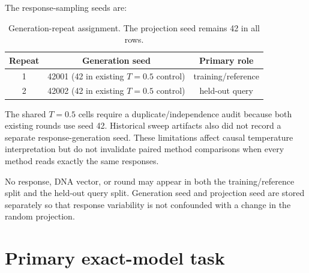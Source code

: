 \documentclass[11pt,a4paper]{article}
\begin{document}
The response-sampling seeds are:

\begin{table}[ht]
\centering
\caption{Generation-repeat assignment. The projection seed remains 42 in all rows.}
\label{tab:repeat-assignment}
\begin{tabular}{ccc}
\toprule
Repeat & Generation seed & Primary role \\
\midrule
1 & 42001 (42 in existing $T=0.5$ control) & training/reference \\
2 & 42002 (42 in existing $T=0.5$ control) & held-out query \\
\bottomrule
\end{tabular}
\end{table}

The shared $T=0.5$ cells require a duplicate/independence audit because both
existing rounds use seed 42. Historical sweep artifacts also did not record a
separate response-generation seed. These limitations affect causal
temperature interpretation but do not invalidate paired method comparisons
when every method reads exactly the same responses.

No response, DNA vector, or round may appear in both the training/reference
split and the held-out query split. Generation seed and projection seed are
stored separately so that response variability is not confounded with a change
in the random projection.

\section{Primary exact-model task}
\end{document}
